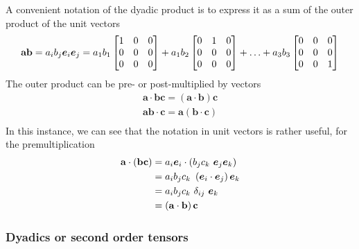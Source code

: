 A convenient notation of the dyadic product is to express it as a sum
of the outer product of the unit vectors
\begin{align*}
  \mathbf a \mathbf b = a_i b_j \boldsymbol e_{i} \boldsymbol e_{j} = 
  a_1 b_1 
  \begin{bmatrix} 1 & 0 & 0 \\ 0 & 0 & 0 \\ 0 & 0 & 0 \end{bmatrix} +
  a_1 b_2 
  \begin{bmatrix} 0 & 1 & 0 \\ 0 & 0 & 0 \\ 0 & 0 & 0 \end{bmatrix} +
  \ldots +
  a_3 b_3
  \begin{bmatrix} 0 & 0 & 0 \\ 0 & 0 & 0 \\ 0 & 0 & 1 \end{bmatrix} 
\end{align*}
The outer product can be pre- or post-multiplied by vectors 
\begin{align*}
  \mathbf a \cdot \mathbf b \mathbf c = (\mathbf a \cdot \mathbf b) \mathbf c \\
  \mathbf a \mathbf b \cdot \mathbf c = \mathbf a (\mathbf b \cdot \mathbf c) \\
\end{align*}
In this instance, we can see that the notation in unit vectors is
rather useful, \eg for the premultiplication
\begin{align*}
  \mathbf a \cdot \left(\mathbf b \mathbf c\right) &= a_i \boldsymbol e_{i} \cdot \left(b_j c_k ~\boldsymbol e_{j} \boldsymbol e_{k} \right) \\
  &= a_i b_j c_k ~\left(\boldsymbol e_{i} \cdot  \boldsymbol e_{j}\right) \boldsymbol e_{k} \\
  &= a_i b_j c_k ~ \delta_{ij} ~\boldsymbol e_{k} \\
  &= \left(\mathbf a \cdot \mathbf b\right) \mathbf c
\end{align*}

\subsubsection{Dyadics or second order tensors}

